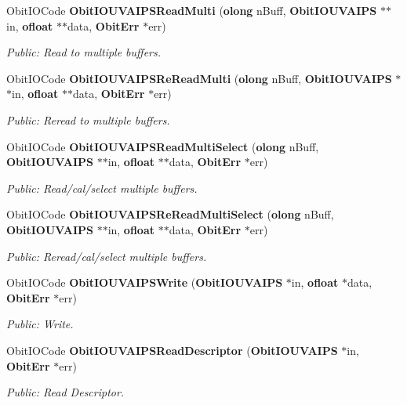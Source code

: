 \begin{CompactItemize}
Obit\-IOCode {\bf Obit\-IOUVAIPSRead\-Multi} ({\bf olong} n\-Buff, {\bf Obit\-IOUVAIPS} $\ast$$\ast$in, {\bf ofloat} $\ast$$\ast$data, {\bf Obit\-Err} $\ast$err)
\begin{CompactList}\small\item\em Public: Read to multiple buffers. \item\end{CompactList}\item 
Obit\-IOCode {\bf Obit\-IOUVAIPSRe\-Read\-Multi} ({\bf olong} n\-Buff, {\bf Obit\-IOUVAIPS} $\ast$$\ast$in, {\bf ofloat} $\ast$$\ast$data, {\bf Obit\-Err} $\ast$err)
\begin{CompactList}\small\item\em Public: Reread to multiple buffers. \item\end{CompactList}\item 
Obit\-IOCode {\bf Obit\-IOUVAIPSRead\-Multi\-Select} ({\bf olong} n\-Buff, {\bf Obit\-IOUVAIPS} $\ast$$\ast$in, {\bf ofloat} $\ast$$\ast$data, {\bf Obit\-Err} $\ast$err)
\begin{CompactList}\small\item\em Public: Read/cal/select multiple buffers. \item\end{CompactList}\item 
Obit\-IOCode {\bf Obit\-IOUVAIPSRe\-Read\-Multi\-Select} ({\bf olong} n\-Buff, {\bf Obit\-IOUVAIPS} $\ast$$\ast$in, {\bf ofloat} $\ast$$\ast$data, {\bf Obit\-Err} $\ast$err)
\begin{CompactList}\small\item\em Public: Reread/cal/select multiple buffers. \item\end{CompactList}\item 
Obit\-IOCode {\bf Obit\-IOUVAIPSWrite} ({\bf Obit\-IOUVAIPS} $\ast$in, {\bf ofloat} $\ast$data, {\bf Obit\-Err} $\ast$err)
\begin{CompactList}\small\item\em Public: Write. \item\end{CompactList}\item 
Obit\-IOCode {\bf Obit\-IOUVAIPSRead\-Descriptor} ({\bf Obit\-IOUVAIPS} $\ast$in, {\bf Obit\-Err} $\ast$err)
\begin{CompactList}\small\item\em Public: Read Descriptor. \item\end{CompactList}\item 

\end{CompactItemize}

